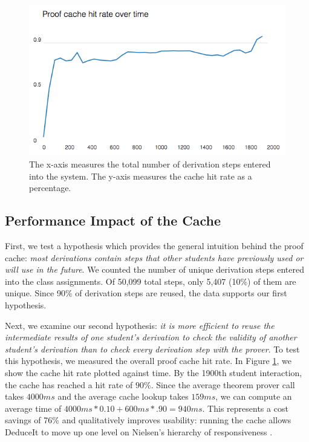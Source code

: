 \documentclass{sigchi}
\begin{document}
\begin{figure}[!h]
\centering
\includegraphics[width=1\columnwidth]{cache}
\caption{The x-axis measures the total number of derivation steps entered into the system. The y-axis measures the cache hit rate as a percentage.}
\label{fig:proofcache}
\end{figure}

\subsection{Performance Impact of the Cache}
First, we test a hypothesis which provides the general intuition behind the proof cache: \textit{most derivations contain steps that other students have previously used or will use in the future}. We counted the number of unique derivation steps entered into the class assignments. Of 50,099 total steps, only 5,407 (10\%) of them are unique. Since 90\% of derivation steps are reused, the data supports our first hypothesis.

Next, we examine our second hypothesis: \textit{it is more efficient to reuse the intermediate results of one student's derivation to check the validity of another student's derivation than to check every derivation step with the prover}. To test this hypothesis, we measured the overall proof cache hit rate. In Figure \ref{fig:proofcache}, we show the cache hit rate plotted against time. By the 1900th student interaction, the cache has reached a hit rate of $90\%$. Since the average theorem prover call takes $4000ms$ and the average cache lookup takes $159ms$, we can compute an average time of $4000ms*0.10+600ms*.90=940ms$. This represents a cost savings of 76\% and qualitatively improves usability: running the cache allows DeduceIt to move up one level on Nielsen's hierarchy of responsiveness \cite{neilsen}. %
\end{document}

